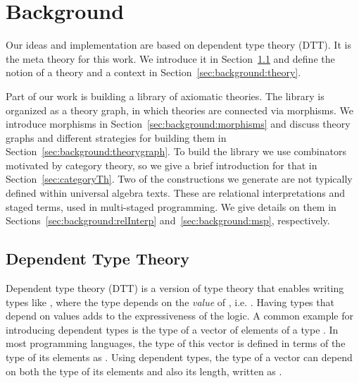 \chapter{Background}
\label{ch:background}
Our ideas and implementation are based on dependent type theory (DTT). It is the meta theory for this work. We introduce it in Section~\ref{subsec:background:dtt} and define the notion of a theory and a context in Section~\ref{sec:background:theory}.

Part of our work is building a library of axiomatic theories. The library is organized as a theory graph, in which theories are connected via morphisms. We introduce morphisms in Section~\ref{sec:background:morphisms} and discuss theory graphs and different strategies for building them in Section~\ref{sec:background:theorygraph}. 
To build the library we use combinators motivated by category theory, so we give a brief introduction for that in Section~\ref{sec:categoryTh}. 
Two of the constructions we generate are not typically defined within universal algebra texts. These are relational interpretations and staged terms, used in multi-staged programming. We give details on them in Sections~\ref{sec:background:relInterp} and~\ref{sec:background:msp}, respectively. 

\section{Dependent Type Theory}
\label{subsec:background:dtt}
Dependent type theory (DTT) is a version of type theory that enables writing types like 
, %
where the type  depends on the \emph{value} of , i.e. . 
Having types that depend on values adds to the expressiveness of the logic. A common example for introducing dependent types is the type of a vector of  elements of a type . 
In most programming languages, the type of this vector is defined in terms of the type of its elements as . Using dependent types, the type of a vector can depend on both the type of its elements and also its length, written as .
 
